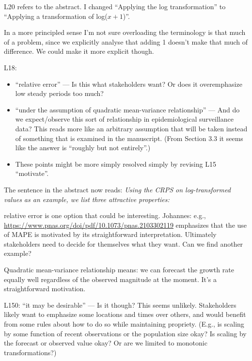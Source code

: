 \documentclass{article}
\newcommand{\red}{\color{red}}
\newcommand{\black}{\color{black}}
\begin{document}
\black
L20 refers to the abstract. I changed ``Applying the log transformation'' to ``Applying a transformation of log($x + 1$)''. 

In a more principled sense I'm not sure overloading the terminology is that much of a problem, since we explicitly analyse that adding 1 doesn't make that much of difference. We could make it more explicit though. 


\red
L18:
\begin{itemize}
    \item ``relative error'' --- Is this what stakeholders want? Or does it overemphasize low steady periods too much?
    \item ``under the assumption of quadratic mean-variance relationship'' --- And do we expect/observe this sort of relationship in epidemiological surveillance data? This reads more like an arbitrary assumption that will be taken instead of something that is examined in the manuscript. (From Section 3.3 it seems like the answer is ``roughly but not entirely''.)
    \item These points might be more simply resolved simply by revising L15 ``motivate''.
\end{itemize}
\black 

The sentence in the abstract now reads: 
\textit{Using the CRPS on log-transformed values as an example, we list three attractive properties:}

relative error is one option that could be interesting. 
Johannes: e.g., \url{https://www.pnas.org/doi/pdf/10.1073/pnas.2103302119} emphasizes that the use of MAPE is motivated by its
straightforward interpretation. 
Ultimately stakeholders need to decide for themselves what they want. 
Can we find another example?

Quadratic mean-variance relationship means: we can forecast the growth rate equally well regardless of the observed magnitude at the moment. It's a straightforward motivation. 



\red
L150: “it may be desirable” — Is it though? This seems unlikely. Stakeholders likely want to emphasize some locations and times over others, and would benefit from some rules about how to do so while maintaining propriety. (E.g., is scaling by some function of recent observations or the population size okay? Is scaling by the forecast or observed value okay? Or are we limited to monotonic transformations?)
\end{document}
